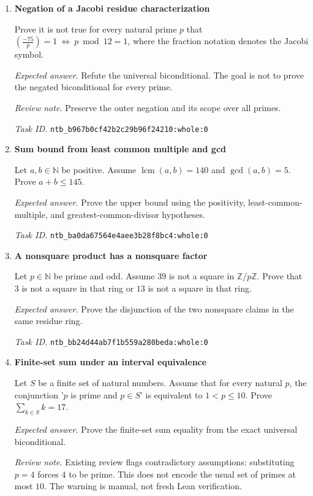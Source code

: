 \documentclass[11pt]{article}
\newcommand{\pth}[1]{\nolinkurl{#1}}
\begin{document}
\begin{enumerate}[label={TEST \arabic*.},leftmargin=4.5em,itemsep=1em]
\emph{Task ID.} \pth{ntb_b6e5df954bbe811b2595e721:whole:0}

\item \textbf{Negation of a Jacobi residue characterization}\label{qn:test:61}

Prove it is not true for every natural prime $p$ that $\left(\frac{-75}{p}\right)=1\ \Longleftrightarrow\ p\bmod12=1$, where the fraction notation denotes the Jacobi symbol.

\emph{Expected answer.} Refute the universal biconditional. The goal is not to prove the negated biconditional for every prime.

\emph{Review note.} Preserve the outer negation and its scope over all primes.

\emph{Task ID.} \pth{ntb_b967b0cf42b2c29b96f24210:whole:0}

\item \textbf{Sum bound from least common multiple and gcd}\label{qn:test:62}

Let $a,b\in\mathbb N$ be positive. Assume $\operatorname{lcm}(a,b)=140$ and $\gcd(a,b)=5$. Prove $a+b\le145$.

\emph{Expected answer.} Prove the upper bound using the positivity, least-common-multiple, and greatest-common-divisor hypotheses.

\emph{Task ID.} \pth{ntb_ba0da67564e4aee3b28f8bc4:whole:0}

\item \textbf{A nonsquare product has a nonsquare factor}\label{qn:test:63}

Let $p\in\mathbb N$ be prime and odd. Assume $39$ is not a square in $\mathbb Z/p\mathbb Z$. Prove that $3$ is not a square in that ring or $13$ is not a square in that ring.

\emph{Expected answer.} Prove the disjunction of the two nonsquare claims in the same residue ring.

\emph{Task ID.} \pth{ntb_bb24d44ab7f1b559a280beda:whole:0}

\item \textbf{Finite-set sum under an interval equivalence}\label{qn:test:64}

Let $S$ be a finite set of natural numbers. Assume that for every natural $p$, the conjunction '$p$ is prime and $p\in S$' is equivalent to $1<p\le10$. Prove $\sum_{k\in S}k=17$.

\emph{Expected answer.} Prove the finite-set sum equality from the exact universal biconditional.

\emph{Review note.} Existing review flags contradictory assumptions: substituting $p=4$ forces $4$ to be prime. This does not encode the usual set of primes at most $10$. The warning is manual, not fresh Lean verification.


\end{enumerate}
\end{document}
